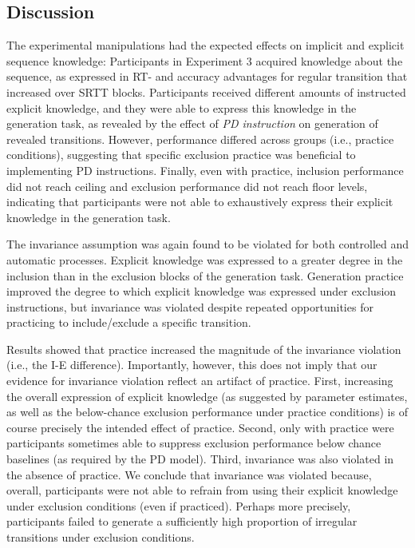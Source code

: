 \documentclass[floatsintext,man]{apa6}
\begin{document}
\subsection{Discussion}\label{discussion-2}

The experimental manipulations had the expected effects on implicit and
explicit sequence knowledge: Participants in Experiment 3 acquired
knowledge about the sequence, as expressed in RT- and accuracy
advantages for regular transition that increased over SRTT blocks.
Participants received different amounts of instructed explicit
knowledge, and they were able to express this knowledge in the
generation task, as revealed by the effect of \emph{PD instruction} on
generation of revealed transitions. However, performance differed across
groups (i.e., practice conditions), suggesting that specific exclusion
practice was beneficial to implementing PD instructions. Finally, even
with practice, inclusion performance did not reach ceiling and exclusion
performance did not reach floor levels, indicating that participants
were not able to exhaustively express their explicit knowledge in the
generation task.

The invariance assumption was again found to be violated for both
controlled and automatic processes. Explicit knowledge was expressed to
a greater degree in the inclusion than in the exclusion blocks of the
generation task. Generation practice improved the degree to which
explicit knowledge was expressed under exclusion instructions, but
invariance was violated despite repeated opportunities for practicing to
include/exclude a specific transition.

Results showed that practice increased the magnitude of the invariance
violation (i.e., the I-E difference). Importantly, however, this does
not imply that our evidence for invariance violation reflect an artifact
of practice. First, increasing the overall expression of explicit
knowledge (as suggested by parameter estimates, as well as the
below-chance exclusion performance under practice conditions) is of
course precisely the intended effect of practice. Second, only with
practice were participants sometimes able to suppress exclusion
performance below chance baselines (as required by the PD model). Third,
invariance was also violated in the absence of practice. We conclude
that invariance was violated because, overall, participants were not
able to refrain from using their explicit knowledge under exclusion
conditions (even if practiced). Perhaps more precisely, participants
failed to generate a sufficiently high proportion of irregular
transitions under exclusion conditions.
\end{document}
